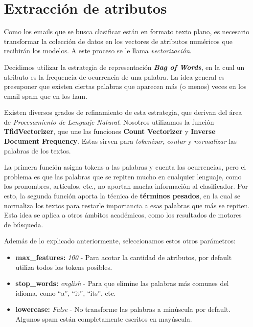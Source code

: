 \section{Extracción de atributos}
Como los emails que se busca clasificar están en formato texto plano, es necesario transformar la colección de datos en los vectores de atributos numéricos que recibirán los modelos. A este proceso se le llama \textit{vectorización}.

Decidimos utilizar la estrategia de representación \textbf{\textit{Bag of Words}}, en la cual un atributo es la frequencia de ocurrencia de una palabra. La idea general es presuponer que existen ciertas palabras que aparecen más (o menos) veces en los email spam que en los ham. 

Existen diversos grados de refinamiento de esta estrategia, que derivan del área de \textit{Procesamiento de Lenguaje Natural}. Nosotros utilizamos la función \textbf{TfidVectorizer}, que une las funciones \textbf{Count Vectorizer} y \textbf{Inverse Document Frequency}. Estas sirven para \textit{tokenizar}, \textit{contar} y \textit{normalizar} las palabras de los textos.

La primera función asigna tokens a las palabras y cuenta las ocurrencias, pero el problema es que las palabras que se repiten mucho en cualquier lenguaje, como los pronombres, artículos, etc., no aportan mucha información al clasificador. Por esto, la segunda función aporta la técnica de \textbf{términos pesados}, en la cual se normaliza los textos para restarle importancia a esas palabras que más se repiten. Esta idea se aplica a otros ámbitos académicos, como los resultados de motores de búsqueda.

Además de lo explicado anteriormente, seleccionamos estos otros parámetros:
\begin{itemize}
\item \textbf{max\_features:} \textit{100} - Para acotar la cantidad de atributos, por default utiliza todos los tokens posibles.
\item \textbf{stop\_words:} \textit{english} - Para que elimine las palabras más comunes del idioma, como ``a'', ``it'', ``its'', etc.
\item \textbf{lowercase:} \textit{False} - No transforme las palabras a minúscula por default. Algunos spam están completamente escritos en mayúscula.
\end{itemize}
